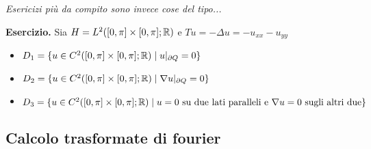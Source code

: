 \textit{Esericizi più da compito sono invece cose del tipo...}

\textbf{Esercizio.}
Sia $H = L^2([0, \pi] \times [0, \pi]; \mathbb R)$ e $T u = -\Delta u = -u_{xx} -u_{yy}$
\begin{itemize}
	\item $D_1 = \{ u \in C^2([0, \pi] \times [0, \pi]; \mathbb R) \mid u|_{\partial Q} = 0 \}$
	\item $D_2 = \{ u \in C^2([0, \pi] \times [0, \pi]; \mathbb R) \mid \nabla u|_{\partial Q} = 0 \}$
	\item $D_3 = \{ u \in C^2([0, \pi] \times [0, \pi]; \mathbb R) \mid \text{$u = 0$ su due lati paralleli e $\nabla u = 0$ sugli altri due} \}$
\end{itemize}

\subsection{Calcolo trasformate di fourier}